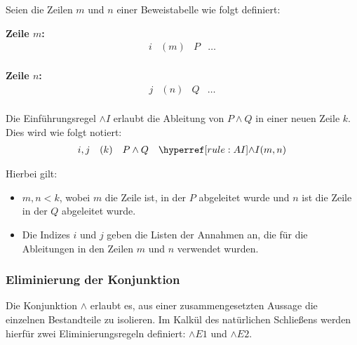 \documentclass[main.tex]{subfiles}
\begin{document}
\begin{definition}
Seien die Zeilen \( m \) und \( n \) einer Beweistabelle wie folgt definiert:

\textbf{Zeile \( m \):}
\[
\begin{array}{llll}
    i & (m) & P & \dots \\
\end{array}
\]

\textbf{Zeile \( n \):}
\[
\begin{array}{llll}
    j & (n) & Q & \dots \\
\end{array}
\]

Die Einführungsregel \(\land I\) erlaubt die Ableitung von \( P \land Q \) in einer neuen Zeile \( k \). Dies wird wie folgt notiert:
\[
\begin{array}{llll}
    i, j & (k) & P \land Q & \rAI{m,n} \\
\end{array}
\]

Hierbei gilt:
\begin{itemize}
    \item \(m, n < k\), wobei \(m\) die Zeile ist, in der \(P\) abgeleitet wurde und \(n\) ist die Zeile in der \(Q\) abgeleitet wurde.
    \item Die Indizes \( i \) und \( j \) geben die Listen der Annahmen an, die für die Ableitungen in den Zeilen \( m \) und \( n \) verwendet wurden. 
\end{itemize}

\end{definition}

\subsubsection{Eliminierung der Konjunktion}
\label{rule:AE1}\label{rule:AE2}
Die Konjunktion \(\land\) erlaubt es, aus einer zusammengesetzten Aussage die einzelnen Bestandteile zu isolieren. Im Kalkül des natürlichen Schließens werden hierfür zwei Eliminierungsregeln definiert: \(\land E1\) und \(\land E2\).
\end{document}

